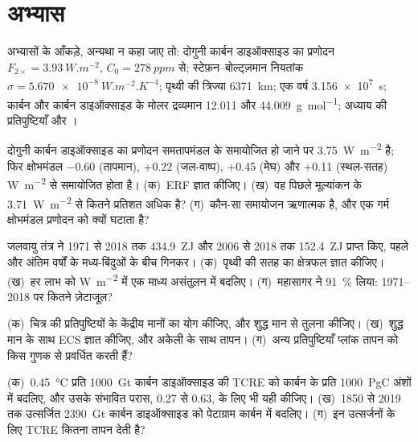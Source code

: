 \section*{अभ्यास}\label{sec:b2:anthropogenic-climate-change:exercises}

अभ्यासों के आँकड़े, अन्यथा न कहा जाए तो: दोगुनी कार्बन डाइऑक्साइड का प्रणोदन $F_{2\times} =
\qty{3.93}{W.m^{-2}}$, $C_0 = \qty{278}{ppm}$ से; स्टेफ़न--बोल्ट्ज़मान नियतांक $\sigma =
\qty{5.670e-8}{W.m^{-2}.K^{-4}}$; पृथ्वी की त्रिज्या \qty{6371}{km}; एक वर्ष
\qty{3.156e7}{s}; कार्बन और कार्बन डाइऑक्साइड के मोलर द्रव्यमान 12.011 और \qty{44.009}{g.mol^{-1}};
अध्याय की प्रतिपुष्टियाँ और ।

\begin{exercise}[$\star$]\label{exo:b2:anthropogenic-climate-change:1}
दोगुनी कार्बन डाइऑक्साइड का प्रणोदन समतापमंडल के समायोजित हो जाने पर \qty{3.75}{W.m^{-2}} है;
फिर क्षोभमंडल $-0.60$ (तापमान), +0.22 (जल-वाष्प), +0.45 (मेघ) और
+0.11 (स्थल-सतह) \unit{W.m^{-2}} से समायोजित होता है। (क)~ERF ज्ञात कीजिए। (ख)~वह पिछले मूल्यांकन के
\qty{3.71}{W.m^{-2}} से कितने प्रतिशत अधिक है? (ग)~कौन-सा समायोजन ऋणात्मक है, और एक गर्म
क्षोभमंडल प्रणोदन को क्यों घटाता है?
\end{exercise}

\begin{exercise}[$\star$]\label{exo:b2:anthropogenic-climate-change:2}
जलवायु तंत्र ने 1971 से 2018 तक \qty{434.9}{ZJ} और 2006 से 2018 तक \qty{152.4}{ZJ} प्राप्त किए,
पहले और अंतिम वर्षों के मध्य-बिंदुओं के बीच गिनकर। (क)~पृथ्वी की सतह का क्षेत्रफल ज्ञात कीजिए।
(ख)~हर लाभ को \unit{W.m^{-2}} में एक माध्य असंतुलन में बदलिए। (ग)~महासागर ने
\qty{91}{\percent} लिया: 1971--2018 पर कितने ज़ेटाजूल?
\end{exercise}

\begin{exercise}[$\star$]\label{exo:b2:anthropogenic-climate-change:3}
(क)~चित्र की प्रतिपुष्टियों के केंद्रीय मानों का योग कीजिए, और शुद्ध मान से तुलना कीजिए। (ख)~शुद्ध मान
के साथ ECS ज्ञात कीजिए, और अकेली  के साथ तापन। (ग)~अन्य प्रतिपुष्टियाँ प्लांक तापन को
किस गुणक से प्रवर्धित करती हैं?
\end{exercise}

\begin{exercise}[$\star$]\label{exo:b2:anthropogenic-climate-change:4}
(क)~\qty{0.45}{\celsius} प्रति \qty{1000}{Gt} कार्बन डाइऑक्साइड की TCRE को कार्बन के प्रति
\qty{1000}{PgC} अंशों में बदलिए, और उसके संभावित परास, 0.27 से 0.63, के लिए भी यही कीजिए। (ख)~1850 से 2019 तक
उत्सर्जित \qty{2390}{Gt} कार्बन डाइऑक्साइड को पेटाग्राम कार्बन में बदलिए। (ग)~इन उत्सर्जनों के लिए
TCRE कितना तापन देती है?
\end{exercise}

